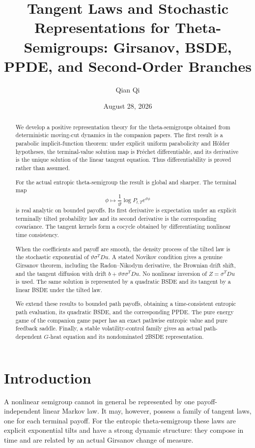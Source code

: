 \documentclass[11pt,reqno]{amsart}
\title[Tangent laws and stochastic representations]{Tangent Laws and Stochastic Representations for Theta-Semigroups: Girsanov, BSDE, PPDE, and Second-Order Branches}
\author{Qian Qi}
\date{August 28, 2026}
\theoremstyle{definition}
\theoremstyle{remark}
\begin{document}
\begin{abstract}
We develop a positive representation theory for the theta-semigroups obtained
from deterministic moving-cut dynamics in the companion papers.  The first
result is a parabolic implicit-function theorem: under explicit uniform
parabolicity and H\"older hypotheses, the terminal-value solution map is
Fr\'echet differentiable, and its derivative is the unique solution of the
linear tangent equation.  Thus differentiability is proved rather than
assumed.

For the actual entropic theta-semigroup the result is global and sharper.  The
terminal map
\[
\phi\longmapsto\frac1\vartheta\log P_{t,T}e^{\vartheta\phi}
\]
is real analytic on bounded payoffs.  Its first derivative is expectation
under an explicit terminally tilted probability law and its second derivative
is the corresponding covariance.  The tangent kernels form a cocycle obtained
by differentiating nonlinear time consistency.

When the coefficients and payoff are smooth, the density process of the tilted
law is the stochastic exponential of
$\vartheta\sigma^TDu$.  A stated Novikov condition gives a genuine Girsanov
theorem, including the Radon--Nikodym derivative, the Brownian drift shift, and
the tangent diffusion with drift $b+\vartheta\sigma\sigma^TDu$.  No nonlinear
inversion of $Z=\sigma^TDu$ is used.  The same solution is represented by a
quadratic BSDE and its tangent by a linear BSDE under the tilted law.

We extend these results to bounded path payoffs, obtaining a time-consistent
entropic path evaluation, its quadratic BSDE, and the corresponding PPDE.  The
pure energy game of the companion game paper has an exact pathwise entropic
value and pure feedback saddle.  Finally, a stable volatility-control family
gives an actual path-dependent $G$-heat equation and its nondominated 2BSDE
representation.
\end{abstract}

\maketitle
\tableofcontents

\section{Introduction}

A nonlinear semigroup cannot in general be represented by one
payoff-independent linear Markov law.  It may, however, possess a family of
tangent laws, one for each terminal payoff.  For the entropic theta-semigroup
these laws are explicit exponential tilts and have a strong dynamic structure:
they compose in time and are related by an actual Girsanov change of measure.
\end{document}
